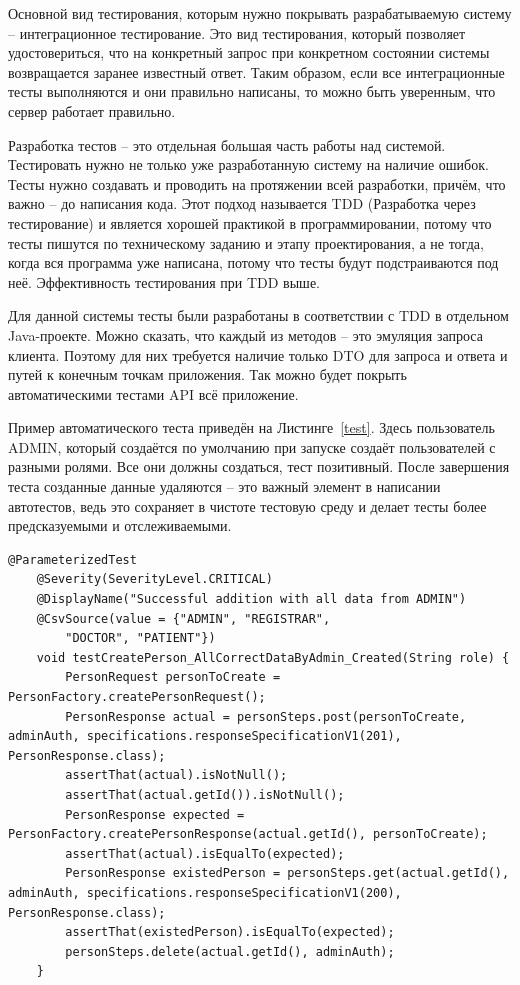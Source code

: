 \documentclass[a4paper,article]{article}
\begin{document}
\begin{sloppypar}
    Основной вид тестирования, которым нужно покрывать разрабатываемую систему -- интеграционное тестирование. Это вид тестирования, который позволяет удостовериться, что на конкретный запрос при конкретном состоянии системы возвращается заранее известный ответ. Таким образом, если все интеграционные тесты выполняются и они правильно написаны, то можно быть уверенным, что сервер работает правильно.

    Разработка тестов -- это отдельная большая часть работы над системой. Тестировать нужно не только уже разработанную систему на наличие ошибок. Тесты нужно создавать и проводить на протяжении всей разработки, причём, что важно -- до написания кода. Этот подход называется TDD (Разработка через тестирование) и является хорошей практикой в программировании, потому что тесты пишутся по техническому заданию и этапу проектирования, а не тогда, когда вся программа уже написана, потому что тесты будут подстраиваются под неё. Эффективность тестирования при TDD выше.~\cite{cleancode}

    Для данной системы тесты были разработаны в соответствии с TDD в отдельном Java-проекте. Можно сказать, что каждый из методов -- это эмуляция запроса клиента. Поэтому для них требуется наличие только DTO для запроса и ответа и путей к конечным точкам приложения. Так можно будет покрыть автоматическими тестами API всё приложение.

    Пример автоматического теста приведён на Листинге~\ref{test}. Здесь пользователь ADMIN, который создаётся по умолчанию при запуске создаёт пользователей с разными ролями. Все они должны создаться, тест позитивный. После завершения теста созданные данные удаляются -- это важный элемент в написании автотестов, ведь это сохраняет в чистоте тестовую среду и делает тесты более предсказуемыми и отслеживаемыми.

    \begin{lstlisting}[label=test,caption=Пример автотеста для разработанной системы]
    @ParameterizedTest
    @Severity(SeverityLevel.CRITICAL)
    @DisplayName("Successful addition with all data from ADMIN")
    @CsvSource(value = {"ADMIN", "REGISTRAR",
    	"DOCTOR", "PATIENT"})
    void testCreatePerson_AllCorrectDataByAdmin_Created(String role) {
        PersonRequest personToCreate = PersonFactory.createPersonRequest();
        PersonResponse actual = personSteps.post(personToCreate, adminAuth, specifications.responseSpecificationV1(201), PersonResponse.class);
        assertThat(actual).isNotNull();
        assertThat(actual.getId()).isNotNull();
        PersonResponse expected = PersonFactory.createPersonResponse(actual.getId(), personToCreate);
        assertThat(actual).isEqualTo(expected);
        PersonResponse existedPerson = personSteps.get(actual.getId(), adminAuth, specifications.responseSpecificationV1(200), PersonResponse.class);
        assertThat(existedPerson).isEqualTo(expected);
        personSteps.delete(actual.getId(), adminAuth);
    }
    \end{lstlisting}


\end{sloppypar}
\end{document}
